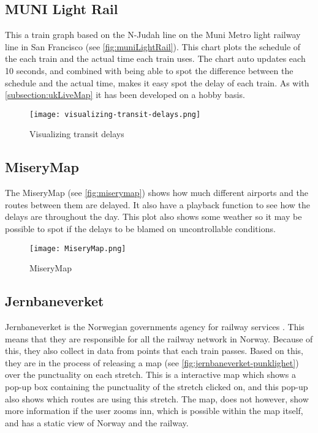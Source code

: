 \subsection{MUNI Light Rail}
\label{sub:subsection_muniLightRail}

This a train graph based on the N-Judah line on the Muni Metro light railway line in San Francisco (see \vref{fig:muniLightRail}). 
This chart plots the schedule of the each train and the actual time each train 
uses. The chart auto updates each 10 seconds, and combined with being able 
to spot the difference between the schedule and the actual time, makes it easy 
spot the delay of each train. As with \vref{subsection:ukLiveMap} it has been 
developed on a hobby basis.

\begin{figure}[!htbp]
	\texttt{[image: visualizing-transit-delays.png]}
	\caption[Visualizing transit delays]{Visualizing transit delays \cite{muniLightRail}}
	\label{fig:muniLightRail}
\end{figure}
\pagebreak


\subsection{MiseryMap}
\label{sub:subsection_zugmonitor}

The MiseryMap (see \vref{fig:miserymap}) shows how much different airports and 
the routes between them are delayed. It also have a playback function to see
how the delays are throughout the day. This plot also shows some weather so it
may be possible to spot if the delays to be blamed on uncontrollable
conditions. 

\begin{figure}[!htbp]
	\texttt{[image: MiseryMap.png]}
	\caption[MiseryMap]{MiseryMap \cite{flightAware:MiseryMap}}
	\label{fig:miserymap}
\end{figure}
 
\subsection{Jernbaneverket}
\label{sub:subsection_jernbaneverket}

Jernbaneverket is the Norwegian governments agency for railway services \cite{jernbaneverketAbout}.
This means that they are responsible for all the railway network in Norway.
Because of this, they also collect in data from points that each train passes. 
Based on this, they are in the process of releasing a map (see \vref{fig:jernbaneverket-punklighet}) over the punctuality on each stretch. This is a 
interactive map which shows a pop-up box containing the punctuality of the 
stretch clicked on, and this pop-up also shows which routes are using this 
stretch. The map, does not however, show more information if the user zooms 
inn, which is possible within the map itself, and has a static view of Norway 
and the railway.

